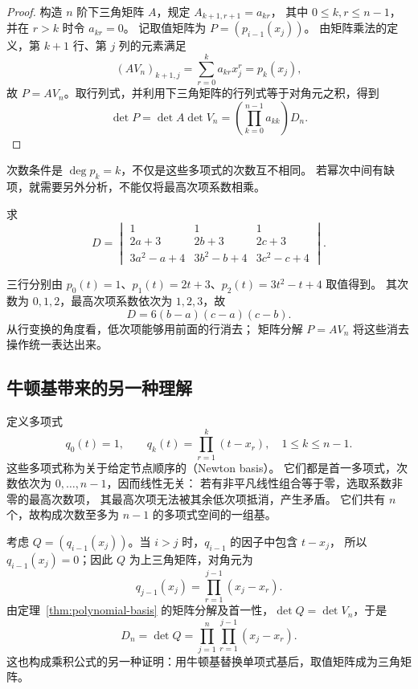 \documentclass[UTF8,12pt,a4paper,fontset=fandol]{ctexart}
\begin{document}
\begin{proof}
构造 $n$ 阶下三角矩阵 $A$，规定 $A_{k+1,r+1}=a_{kr}$，
其中 $0\leq k,r\leq n-1$，并在 $r>k$ 时令 $a_{kr}=0$。
记取值矩阵为 $P=(p_{i-1}(x_j))$。
由矩阵乘法的定义，第 $k+1$ 行、第 $j$ 列的元素满足
\[
  (AV_n)_{k+1,j}=\sum_{r=0}^{k}a_{kr}x_j^r=p_k(x_j),
\]
故 $P=AV_n$。取行列式，并利用下三角矩阵的行列式等于对角元之积，得到
\[
  \det P=\det A\det V_n
  =\left(\prod_{k=0}^{n-1}a_{kk}\right)D_n.
\]
\end{proof}

次数条件是 $\deg p_k=k$，不仅是这些多项式的次数互不相同。
若幂次中间有缺项，就需要另外分析，不能仅将最高次项系数相乘。

\begin{example}[低次项不影响结果]
求
\[
  D=\begin{vmatrix}
    1&1&1\\
    2a+3&2b+3&2c+3\\
    3a^2-a+4&3b^2-b+4&3c^2-c+4
  \end{vmatrix}.
\]
\end{example}

\begin{solve}
三行分别由 $p_0(t)=1$、$p_1(t)=2t+3$、$p_2(t)=3t^2-t+4$ 取值得到。
其次数为 $0,1,2$，最高次项系数依次为 $1,2,3$，故
\[
  D=6(b-a)(c-a)(c-b).
\]
从行变换的角度看，低次项能够用前面的行消去；
矩阵分解 $P=AV_n$ 将这些消去操作统一表达出来。
\end{solve}

\subsection{牛顿基带来的另一种理解}

定义多项式
\[
  q_0(t)=1,\qquad q_k(t)=\prod_{r=1}^{k}(t-x_r),\quad 1\leq k\leq n-1.
\]
这些多项式称为关于给定节点顺序的（Newton basis）。
它们都是首一多项式，次数依次为 $0,\ldots,n-1$，因而线性无关：
若有非平凡线性组合等于零，选取系数非零的最高次数项，
其最高次项无法被其余低次项抵消，产生矛盾。
它们共有 $n$ 个，故构成次数至多为 $n-1$ 的多项式空间的一组基。

考虑 $Q=(q_{i-1}(x_j))$。当 $i>j$ 时，$q_{i-1}$ 的因子中包含 $t-x_j$，
所以 $q_{i-1}(x_j)=0$；因此 $Q$ 为上三角矩阵，对角元为
\[
  q_{j-1}(x_j)=\prod_{r=1}^{j-1}(x_j-x_r).
\]
由定理~\ref{thm:polynomial-basis} 的矩阵分解及首一性，$\det Q=\det V_n$，于是
\[
  D_n=\det Q=\prod_{j=1}^n\prod_{r=1}^{j-1}(x_j-x_r).
\]
这也构成乘积公式的另一种证明：用牛顿基替换单项式基后，取值矩阵成为三角矩阵。
\end{document}
